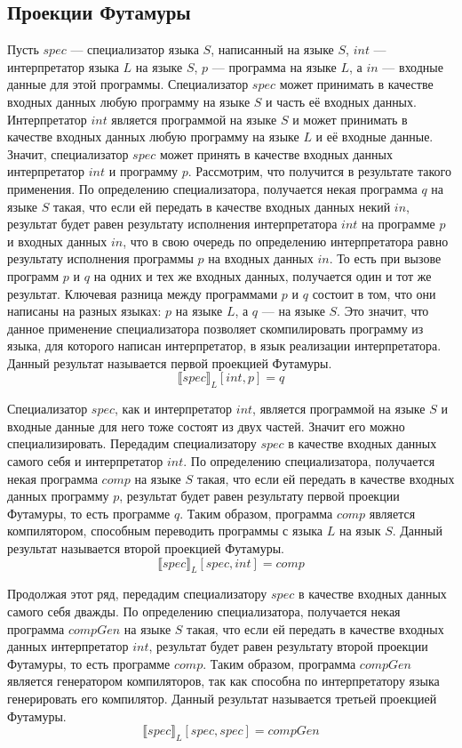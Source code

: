 \subsection{ Проекции Футамуры~\cite{Futa}}
Пусть $spec$ --- специализатор языка $S$, написанный на языке $S$, $int$ --- интерпретатор языка $L$ на языке $S$, $p$ --- программа на языке $L$, а $in$ --- входные данные для этой программы. Специализатор $spec$ может принимать в качестве входных данных любую программу на языке $S$ и часть её входных данных. Интерпретатор $int$ является программой на языке $S$ и может принимать в качестве входных данных любую программу на языке $L$ и её входные данные. Значит, специализатор $spec$ может принять в качестве входных данных интерпретатор $int$ и программу $p$. Рассмотрим, что получится в результате такого применения. По определению специализатора, получается некая программа $q$ на языке $S$ такая, что если ей передать в качестве входных данных некий $in$, результат будет равен результату исполнения интерпретатора $int$ на программе $p$ и входных данных $in$, что в свою очередь по определению интерпретатора равно результату исполнения программы $p$ на входных данных $in$. То есть при вызове программ $p$ и $q$ на одних и тех же входных данных, получается один и тот же результат. Ключевая разница между программами $p$ и $q$ состоит в том, что они написаны на разных языках: $p$ на языке $L$, а $q$ --- на языке $S$. Это значит, что данное применение специализатора позволяет скомпилировать программу из языка, для которого написан интерпретатор, в язык реализации интерпретатора. Данный результат называется первой проекцией Футамуры.
$$\llbracket spec \rrbracket_L [int, p] = q$$

Специализатор $spec$, как и интерпретатор $int$, является программой на языке $S$ и входные данные для него тоже состоят из двух частей. Значит его можно специализировать. Передадим специализатору $spec$ в качестве входных данных самого себя и интерпретатор $int$. По определению специализатора, получается некая программа $comp$ на языке $S$ такая, что если ей передать в качестве входных данных программу $p$, результат будет равен результату первой проекции Футамуры, то есть программе $q$. Таким образом, программа $comp$ является компилятором, способным переводить программы с языка $L$ на язык $S$. Данный результат называется второй проекцией Футамуры.
$$\llbracket spec \rrbracket_L [spec, int] = comp$$

Продолжая этот ряд, передадим специализатору $spec$ в качестве входных данных самого себя дважды. По определению специализатора, получается некая программа $compGen$ на языке $S$ такая, что если ей передать в качестве входных данных интерпретатор $int$, результат будет равен результату второй проекции Футамуры, то есть программе $comp$.
Таким образом, программа $compGen$ является генератором компиляторов, так как способна по интерпретатору языка генерировать его компилятор.
Данный результат называется третьей проекцией Футамуры. 
$$\llbracket spec \rrbracket_L [spec, spec] = compGen$$


